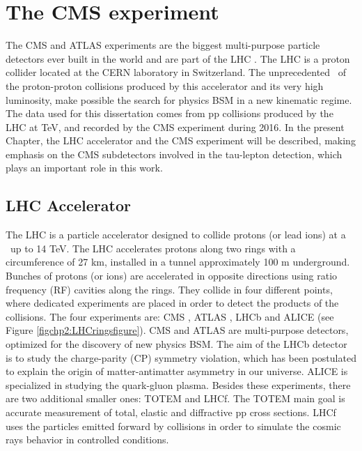 \chapter[Experimental Setup]{The CMS experiment}
\label{chap:CMSExp}
The CMS and ATLAS experiments are the biggest multi-purpose particle detectors
ever built in the world and  are part of the LHC \cite{chp2:LHCTDR}. The LHC is a 
proton collider located at the CERN laboratory in Switzerland. The 
unprecedented \centermassenergy~of the proton-proton collisions 
produced by this accelerator and its very high luminosity, make possible the search
for physics BSM in a new kinematic regime. The data used for this dissertation comes from
pp collisions produced by the LHC at  TeV, and recorded by the CMS experiment during 2016.
In the present Chapter, the LHC accelerator and the CMS experiment will be
described, making emphasis on the CMS subdetectors involved in the 
tau-lepton detection, which plays an important role in this work. 


\section{LHC Accelerator}
\label{sec:LHC}
The LHC is a particle accelerator designed to collide protons (or lead ions) at 
a \centermassenergy~up to 14 TeV. The LHC accelerates protons along 
two rings with a circumference of 27 km, installed in a tunnel 
approximately 100 m underground. Bunches of protons (or ions)
are accelerated in opposite directions using ratio frequency (RF) cavities along the rings. They 
collide in four different points, where dedicated experiments are placed 
in order to detect the products of the collisions. The four experiments
are: CMS \cite{chp2:CMSTDR,chp2:CMSTDR2}, 
ATLAS \cite{chp2:ATLASTDR}, LHCb \cite{chp2:LHCb} and  ALICE \cite{chp2:ALICETDR} (see Figure \ref{figchp2:LHCringsfigure}). CMS 
and ATLAS are multi-purpose detectors, optimized for the discovery of new physics BSM. The aim of the LHCb detector is to study 
the charge-parity (CP) symmetry violation, which has been postulated to explain the origin of matter-antimatter 
asymmetry in our universe. ALICE is specialized in studying the quark-gluon plasma. Besides these experiments, there 
are two additional smaller ones: TOTEM and LHCf. The TOTEM main goal is accurate measurement of total, elastic and diffractive pp
cross sections. LHCf uses the particles emitted forward by collisions in order to simulate
the cosmic rays behavior in controlled conditions. 

